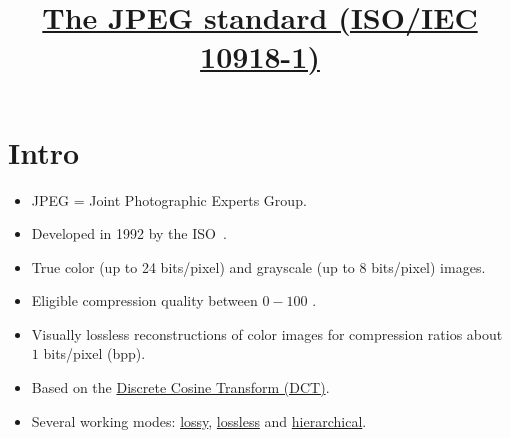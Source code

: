 \title{\href{https://jpeg.org/jpeg/index.html}{The JPEG standard (ISO/IEC 10918-1)}}
\maketitle
\tableofcontents

\section{Intro}
\begin{itemize}
\item JPEG = Joint Photographic Experts Group.
\item Developed in 1992 by the ISO~\cite{CCITT.T81}.
\item True color (up to 24 bits/pixel) and grayscale (up to 8
  bits/pixel) images.
\item Eligible compression quality between $0-100$ \cite{Wallace91}.
\item Visually lossless reconstructions of color images for
  compression ratios about $1$ bits/pixel (bpp).
\item Based on the
  \href{https://en.wikipedia.org/wiki/Discrete_cosine_transform}{Discrete
    Cosine Transform (DCT)}.
\item Several working modes:
  \href{https://en.wikipedia.org/wiki/Lossy_compression}{lossy},
  \href{https://en.wikipedia.org/wiki/Lossless_compression}{lossless}
  and
  \href{https://www.ece.ucdavis.edu/cerl/reliablejpeg/compression/}{hierarchical}.
\end{itemize}

